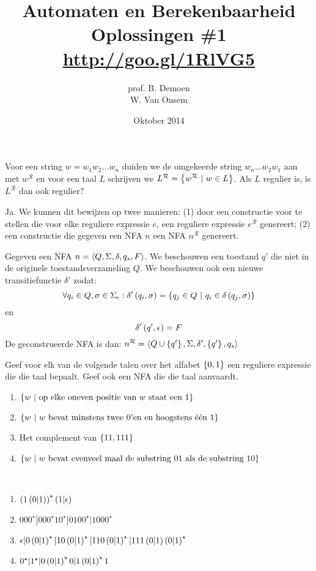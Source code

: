 \documentclass[a4paper]{article}
\title{Automaten en Berekenbaarheid\\Oplossingen \#1\\\url{http://goo.gl/1RlVG5}}
\author{prof. B. Demoen\\W. Van Onsem}
\date{Oktober 2014}
\newcommand{\R}{\mathcal{R}}
\begin{document}
\maketitle

\begin{question}
Voor een string $w = w_1 w_2 \ldots w_n$ duiden we de omgekeerde string $w_n \ldots w_2  w_1$ aan met $w^{\R}$ en voor een taal $L$ schrijven we $L^{\R} = \condset{w^{\R}}{w\in L}$. Als $L$ regulier is, is $L^{\R}$ dan ook regulier?
\begin{answer}
Ja. We kunnen dit bewijzen op twee manieren: (1) door een constructie voor te stellen die voor elke reguliere expressie $e$, een reguliere expressie $e^{\R}$ genereert;  (2) een constructie die gegeven een NFA $n$ een NFA $n^{\R}$ genereert.
\begin{construction}
Gegeven een NFA $n=\left\langle Q,\Sigma,\delta,q_s,F \right\rangle$. We beschouwen een toestand $q'$ die niet in de originele toestandsverzameling $Q$. We beschouwen ook een nieuwe transitiefunctie $\delta'$ zodat:
\begin{equation}
\forall q_i\in Q,\sigma\in\Sigma_\epsilon:\delta'\left( q_i,\sigma \right)=\left\{ q_j\in Q\ |\ q_i\in\delta\left( q_j,\sigma \right) \right\}
\end{equation}
en
\begin{equation}
\delta'\left( q',\epsilon \right)=F
\end{equation}
De geconstrueerde NFA is dan: $n^{\R}=\tupl{Q\cup\accl{q'},\Sigma,\delta',\accl{q'},q_s}$
\end{construction}
\end{answer}
\end{question}

\begin{question}
Geef voor elk van de volgende talen over het alfabet $\left\{ 0,1 \right\}$ een reguliere expressie die die taal bepaalt. Geef ook een NFA die die taal aanvaardt.
\begin{enumerate}
  \item $\left\{ w\ |\ \mbox{op elke oneven positie van $w$ staat een $1$} \right\}$
  \item $\left\{ w\ |\ \mbox{$w$ bevat minstens twee $0$'en en hoogstens \'e\'en $1$} \right\}$
  \item Het complement van $\left\{ 11,111 \right\}$
  \item $\left\{ w\ |\ \mbox{$w$ bevat evenveel maal de substring $01$ als de substring $10$} \right\}$
\end{enumerate}
\begin{answer}~~
\begin{enumerate}
  \item $\left( 1\left( 0|1 \right) \right)^{\star}\left( 1|\epsilon \right)$
  \item $000^{\star}|000^{\star}10^{\star}|0100^{\star}|1000^{\star}$
  \item $\epsilon|0\left( 0|1 \right)^{\star}|10\left( 0|1 \right)^{\star}|110\left( 0|1 \right)^{\star}|111\left( 0|1 \right)\left( 0|1 \right)^{\star}$
  \item $0^{\star}|1^{\star}|0\left( 0|1 \right)^{\star}0|1\left( 0|1 \right)^{\star}1$
\end{enumerate}
\end{answer}
\end{question}
\end{document}
